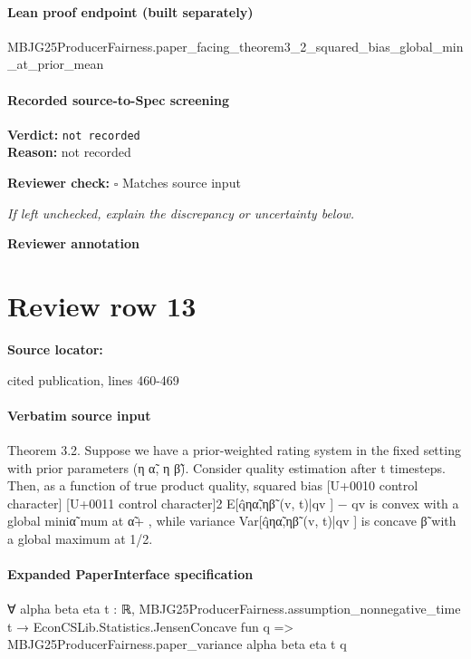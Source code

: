 \documentclass[10pt]{article}
\newcommand{\reviewerbox}{%
  \par\noindent\fbox{\parbox{0.96\linewidth}{\rule{0pt}{0.38in}}}\par
}
\newcommand{\reviewmatch}[1]{%
  \par\noindent\textbf{Reviewer check:} $\square$\; #1\par
  \noindent\emph{If left unchecked, explain the discrepancy or uncertainty below.}\par
}
\begin{document}
\paragraph{Lean proof endpoint (built separately)}\begin{ReviewVerbatim}
MBJG25ProducerFairness.paper_facing_theorem3_2_squared_bias_global_min_at_prior_mean
\end{ReviewVerbatim}

\paragraph{Recorded source-to-Spec screening}
\textbf{Verdict:} \texttt{not recorded}
\\
\textbf{Reason:} not recorded
\reviewmatch{Matches source input}
\noindent\textbf{Reviewer annotation}\par
\reviewerbox
\clearpage
\hypertarget{source-claim-3afe5de598f0ed9d}{}
\section*{Review row 13}
\textbf{Source locator:} {\footnotesize\raggedright cited publication, lines 460-\allowbreak{}469\par}
\paragraph{Verbatim source input}
\begin{ReviewVerbatim}
Theorem 3.2. Suppose we have a prior-weighted rating system in the fixed setting with prior parameters (η α̃, η β̃). Consider quality estimation after t timesteps.
Then, as a function of true product quality, squared bias
[U+0010 control character]
[U+0011 control character]2
E[q̂ηα̃,ηβ̃ (v, t)|qv ] − qv
is convex with a global miniα̃
mum at α̃+
, while variance Var[q̂ηα̃,ηβ̃ (v, t)|qv ] is concave
β̃
with a global maximum at 1/2.
\end{ReviewVerbatim}


\paragraph{Expanded PaperInterface specification}
\begin{ReviewVerbatim}
∀ {alpha beta eta t : ℝ},
  MBJG25ProducerFairness.assumption_nonnegative_time t →
    EconCSLib.Statistics.JensenConcave fun q => MBJG25ProducerFairness.paper_variance alpha beta eta t q
\end{ReviewVerbatim}
\end{document}
